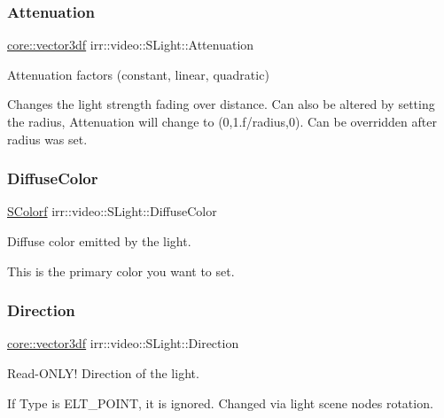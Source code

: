 \subsubsection{\texorpdfstring{Attenuation}{Attenuation}}
{\footnotesize\ttfamily \hyperlink{namespaceirr_1_1core_ae6e2b2a6c552833ebbd5b7463d03586b}{core\+::vector3df} irr\+::video\+::\+S\+Light\+::\+Attenuation}



Attenuation factors (constant, linear, quadratic) 

Changes the light strength fading over distance. Can also be altered by setting the radius, Attenuation will change to (0,1.\+f/radius,0). Can be overridden after radius was set. \mbox{\label{structirr_1_1video_1_1SLight_a226622e93aa1e249fe876fdb9d0186fe}} 
\subsubsection{\texorpdfstring{Diffuse\+Color}{DiffuseColor}}
{\footnotesize\ttfamily \hyperlink{classirr_1_1video_1_1SColorf}{S\+Colorf} irr\+::video\+::\+S\+Light\+::\+Diffuse\+Color}



Diffuse color emitted by the light. 

This is the primary color you want to set. \mbox{\label{structirr_1_1video_1_1SLight_a226c488abec5696b995df6895ab42d41}} 
\subsubsection{\texorpdfstring{Direction}{Direction}}
{\footnotesize\ttfamily \hyperlink{namespaceirr_1_1core_ae6e2b2a6c552833ebbd5b7463d03586b}{core\+::vector3df} irr\+::video\+::\+S\+Light\+::\+Direction}



Read-\/\+O\+N\+L\+Y! Direction of the light. 

If Type is E\+L\+T\+\_\+\+P\+O\+I\+NT, it is ignored. Changed via light scene node\textquotesingle{}s rotation. \mbox{\label{structirr_1_1video_1_1SLight_ac1f0fda0cc1780b09a2597adcfc9c946}} 
